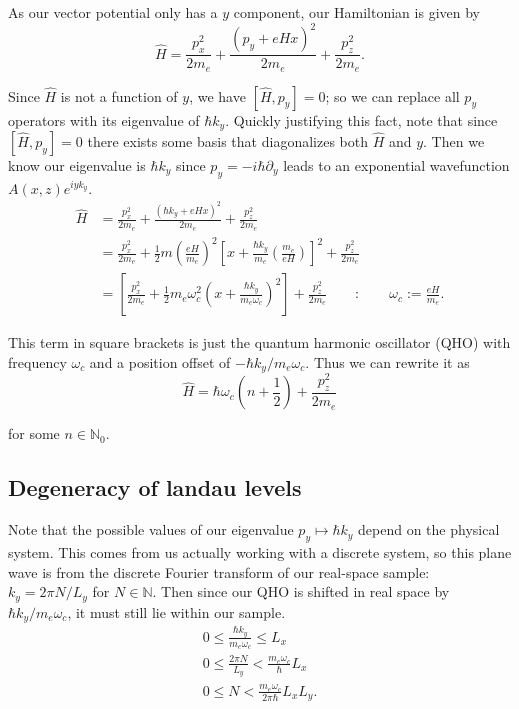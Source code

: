 \documentclass[12pt]{revtex4-2}
\newcommand{\N}{\mathbb{N}}
\begin{document}
As our vector potential only has a $y$ component, our Hamiltonian is given by
\begin{equation}
    \hat{H} = \frac{p_x^2}{2m_e} + \frac{(p_y + eHx)^2}{2m_e} + \frac{p_z^2}{2m_e}.
\end{equation}

Since $\hat{H}$ is not a function of $y$, we have $[\hat{H},p_y] = 0$; so we can replace all $p_y$ operators with its eigenvalue of $\hbar k_y$.  Quickly justifying this fact, note that since $[\hat{H},p_y] = 0$ there exists some basis that diagonalizes both $\hat{H}$ and $y$.  Then we know our eigenvalue is $\hbar k_y$ since $p_y = -i\hbar\partial_y$ leads to an exponential wavefunction $A(x,z)e^{i yk_y}$.
\begin{align}
    \hat{H} &= \frac{p_x^2}{2m_e} + \frac{(\hbar k_y + eHx)^2}{2m_e} + \frac{p_z^2}{2m_e} \\
    &= \frac{p_x^2}{2m_e} + \frac{1}{2}m\left( \frac{eH}{m_e} \right)^2 \left[x + \frac{\hbar k_y}{m_e} \left( \frac{m_e}{eH} \right) \right]^2 + \frac{p_z^2}{2m_e} \\
    &= \left[ \frac{p_x^2}{2m_e} + \frac{1}{2}m_e\omega_c^2\left( x + \frac{\hbar k_y}{m_e\omega_c} \right)^2 \right] + \frac{p_z^2}{2m_e} \qquad : \qquad \omega_c := \frac{eH}{m_e}.
\end{align}

This term in square brackets is just the quantum harmonic oscillator (QHO) with frequency $\omega_c$ and a position offset of $-\hbar k_y/m_e\omega_c$.  Thus we can rewrite it as
\begin{equation}
    \boxed{ \hat{H} = \hbar\omega_c\left( n + \frac{1}{2} \right) + \frac{p_z^2}{2m_e} }
\end{equation}

for some $n \in \N_0$.

\subsection{Degeneracy of landau levels}
Note that the possible values of our eigenvalue $p_y \mapsto \hbar k_y$ depend on the physical system.  This comes from us actually working with a discrete system, so this plane wave is from the discrete Fourier transform of our real-space sample: $k_y = 2\pi N/L_y$ for $N \in \N$.  Then since our QHO is shifted in real space by $\hbar k_y/m_e\omega_c$, it must still lie within our sample.
\begin{gather}
    0 \leq \frac{\hbar k_y}{m_e\omega_c} \leq L_x \\
    0 \leq \frac{2\pi N}{L_y} < \frac{m_e\omega_c}{\hbar}L_x \\
    0 \leq N < \frac{m_e\omega_c}{2\pi\hbar} L_xL_y.
\end{gather}
\end{document}
